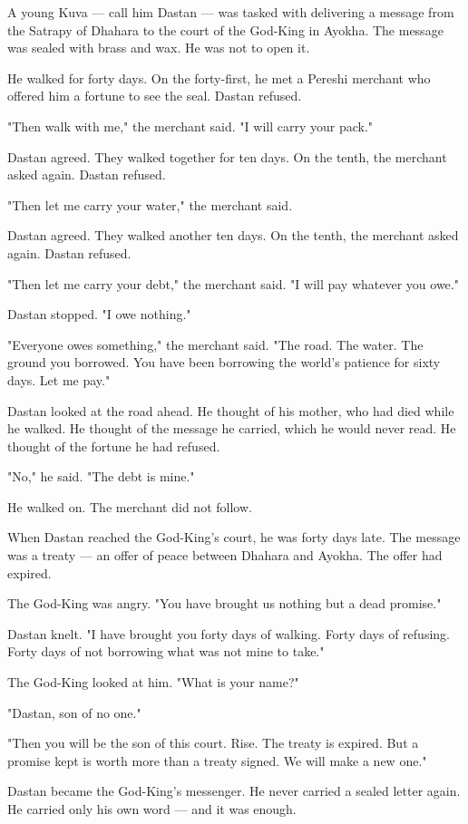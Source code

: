\documentclass[10pt,twoside]{book}
\begin{document}
A young Kuva --- call him Dastan --- was tasked with delivering a message from the Satrapy of Dhahara to the court of the God-King in Ayokha. The message was sealed with brass and wax. He was not to open it.

He walked for forty days. On the forty-first, he met a Pereshi merchant who offered him a fortune to see the seal. Dastan refused.

"Then walk with me," the merchant said. "I will carry your pack."

Dastan agreed. They walked together for ten days. On the tenth, the merchant asked again. Dastan refused.

"Then let me carry your water," the merchant said.

Dastan agreed. They walked another ten days. On the tenth, the merchant asked again. Dastan refused.

"Then let me carry your debt," the merchant said. "I will pay whatever you owe."

Dastan stopped. "I owe nothing."

"Everyone owes something," the merchant said. "The road. The water. The ground you borrowed. You have been borrowing the world's patience for sixty days. Let me pay."

Dastan looked at the road ahead. He thought of his mother, who had died while he walked. He thought of the message he carried, which he would never read. He thought of the fortune he had refused.

"No," he said. "The debt is mine."

He walked on. The merchant did not follow.

When Dastan reached the God-King's court, he was forty days late. The message was a treaty --- an offer of peace between Dhahara and Ayokha. The offer had expired.

The God-King was angry. "You have brought us nothing but a dead promise."

Dastan knelt. "I have brought you forty days of walking. Forty days of refusing. Forty days of not borrowing what was not mine to take."

The God-King looked at him. "What is your name?"

"Dastan, son of no one."

"Then you will be the son of this court. Rise. The treaty is expired. But a promise kept is worth more than a treaty signed. We will make a new one."

Dastan became the God-King's messenger. He never carried a sealed letter again. He carried only his own word --- and it was enough.
\end{document}
